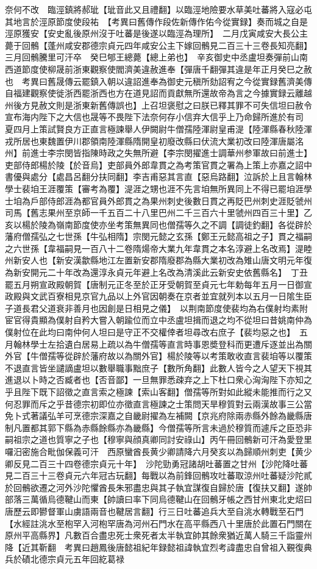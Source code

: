 奈何不改　臨涇鎮將郝玼【玼音此又且禮翻】以臨涇地險要水草美吐蕃將入寇必屯其地言於涇原節度使段祐　【考異曰舊傳作段佐新傳作佑今從實録】奏而城之自是涇原獲安【安史亂後原州沒于吐蕃是後遂以臨涇為理所】　二月戊寅咸安大長公主薨于回鶻【蓬州咸安郡德宗貞元四年咸安公主下嫁回鶻見二百三十三卷長知亮翻】三月回鶻騰里可汗卒　癸巳郇王總薨【總上弟也】　辛亥御史中丞盧坦奏彈前山南西道節度使柳晟前浙東觀察使閻濟美違赦進奉【彈唐千翻彈其違是年正月癸巳之赦也　考異曰舊晟傳云罷鎮入朝以違詔進奉為御史元稹所劾詔宥之今從實録舊濟美傳自福建觀察使徙浙西罷浙西也方在道見詔而貢獻無所還故帝為言之今據實録云離越州後方見赦文則是浙東新舊傳誤也】上召坦褒慰之曰朕已釋其罪不可失信坦曰赦令宣布海内陛下之大信也晟等不畏陛下法奈何存小信弃大信乎上乃命歸所進於有司　夏四月上策試賢良方正直言極諫舉人伊闕尉牛僧孺陸渾尉皇甫湜【陸渾縣春秋陸渾戎所居也東魏置伊川郡領南陸渾縣隋開皇初廢改縣曰伏流大業初改曰陸渾唐屬洺州】前進士李宗閔皆指陳時政之失無所避【李宗閔擢進士調華州参軍故曰前進士】吏部侍郎楊於陵【於音烏】吏部員外郎韋貫之為考策官貫之署為上策上亦嘉之詔中書優與處分【處昌呂翻分扶同翻】李吉甫惡其言直【惡烏路翻】泣訴於上且言翰林學士裴垍王涯覆策【審考為覆】湜涯之甥也涯不先言垍無所異同上不得已罷垍涯學士垍為戶部侍郎涯為都官員外郎貫之為果州刺史後數日貫之再貶巴州刺史涯貶虢州司馬【舊志果州至京師一千五百二十八里巴州二千三百六十里虢州四百三十里】乙亥以楊於陵為嶺南節度使亦坐考策無異同也僧孺等久之不調【調徒釣翻】各從辟於藩府僧孺弘之七世孫【牛弘相隋】宗閔元懿之玄孫【鄭王元懿高祖之子】貫之福嗣之六世孫【韋福嗣見一百八十二卷隋煬帝大業九年韋貫之本名淳避上名改焉】湜睦州新安人也【新安漢歙縣地江左置新安郡隋廢郡為縣大業初改為雉山唐文明元年復為新安開元二十年改為還淳永貞元年避上名改為清溪此云新安史依舊縣名】　丁丑罷五月朔宣政殿朝賀【唐制元正冬至於正牙受朝賀至貞元七年勅每年五月一日御宣政殿與文武百寮相見京官九品以上外官因朝奏在京者並宜就列本以五月一日隂生臣子道長君父道衰非善月也因創是日相見之儀】　以荆南節度使裴均為右僕射均素附宦官得貴顯為僕射自矜大嘗入朝踰位而立中丞盧坦揖而退之均不從坦曰昔姚南仲為僕射位在此均曰南仲何人坦曰是守正不交權倖者坦尋改右庶子【裴均惡之也】　五月翰林學士左拾遺白居易上疏以為牛僧孺等直言時事恩奬登科而更遭斥逐並出為關外官【牛僧孺等從辟於藩府故以為關外官】楊於陵等以考策敢收直言裴垍等以覆策不退直言皆坐譴謫盧坦以數舉職事黜庶子【數所角翻】此數人皆今之人望天下視其進退以卜時之否臧者也【否音鄙】一旦無罪悉疎弃之上下杜口衆心洶洶陛下亦知之乎且陛下既下詔徵之直言索之極諫【索山客翻】僧孺等所對如此縱未能推而行之又何忍罪而斥之乎昔德宗初即位亦徵直言極諫之士策問天旱穆質對云兩漢故事三公當免卜式著議弘羊可烹德宗深嘉之自畿尉擢為左補闕【京兆府除兩赤縣外餘為畿縣唐制凡置都其郭下縣為赤縣餘縣亦為畿縣】今僧孺等所言未過於穆質而遽斥之臣恐非嗣祖宗之道也質寧之子也【穆寧與顔真卿同討安祿山】丙午冊回鶻新可汗為愛登里囉汨密施合毗伽保義可汗　西原蠻酋長黄少卿請降六月癸亥以為歸順州刺吏【黄少卿反見二百三十四卷德宗貞元十年】　沙陀勁勇冠諸胡吐蕃置之甘州【沙陀降吐蕃見二百三十三卷貞元六年冠古玩翻】每戰以為前鋒回鶻攻吐蕃取涼州吐蕃疑沙陀貳於回鶻欲遷之河外沙陀懼酋長朱邪盡忠與其子執宜謀復自歸於唐【復扶又翻】遂帥部落三萬循烏德鞬山而東【帥讀曰率下同烏德鞬山在回鶻牙帳之西甘州東北史炤曰唐歷云即鬰督軍山虜語兩音也鞬居言翻】行三日吐蕃追兵大至自洮水轉戰至石門【水經註洮水至枹罕入河枹罕唐為河州石門水在高平縣西八十里唐於此置石門關在原州平高縣界】凡數百合盡忠死士衆死者太半執宜帥其餘衆猶近萬人騎三千詣靈州降【近其靳翻　考異曰趙鳳後唐懿祖紀年録懿祖諱執宜烈考諱盡忠自曾祖入覲復典兵於磧北德宗貞元五年回紇葛禄